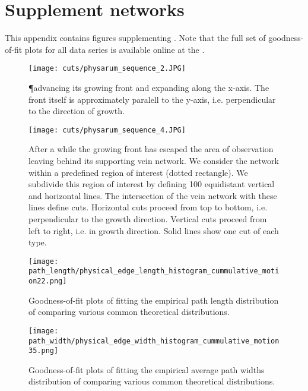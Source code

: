 
\chapter{Supplement networks}

This appendix contains figures supplementing . Note that the full set of goodness-of-fit plots for all data series is available online at the \SMGR. 
\vfill
\begin{figure}[!htbp]
\begin{center}%
  \texttt{[image: cuts/physarum\_sequence\_2.JPG]}
\end{center}%
\caption[\P advancing the apical zone]{\P advancing its growing front and expanding along the x-axis. The front itself is approximately paralell to the y-axis, i.e. perpendicular to the direction of growth. }
\label{fig:sup::physarum_expanding}
\end{figure}
\vfill
\begin{figure}[!htbp]
\begin{center}%
  \texttt{[image: cuts/physarum\_sequence\_4.JPG]}
\end{center}%
\caption[Horizontal and vertical cuts illustrated]{After a while the growing front has escaped the area of observation leaving behind its supporting vein network. We consider the network within a predefined region of interest (dotted rectangle). We subdivide this region of interest by defining 100 equidistant vertical and horizontal lines. The intersection of the vein network with these lines define cuts. Horizontal cuts proceed from top to bottom, i.e. perpendicular to the growth direction. Vertical cuts proceed from left to right, i.e. in growth direction. Solid lines show one cut of each type.}
\label{fig:sup::physarum_roi}
\end{figure}

\begin{figure}[!htbp]
\begin{center}%
  \texttt{[image: path\_length/physical\_edge\_length\_histogram\_cummulative\_motion22.png]}
\end{center}%
\caption[Goodness-of-fit plots: path lengths]{Goodness-of-fit plots of fitting the empirical path length distribution of  comparing various common theoretical distributions.}
\label{fig:sup::path_lengths_goodness}
\end{figure}

\begin{figure}[!htbp]
\begin{center}%
  \texttt{[image: path\_width/physical\_edge\_width\_histogram\_cummulative\_motion35.png]}
\end{center}%
\caption[Goodness-of-fit plots: path widths]{Goodness-of-fit plots of fitting the empirical average path widths distribution of  comparing various common theoretical distributions.}
\label{fig:sup::path_widths_goodness}
\end{figure}

